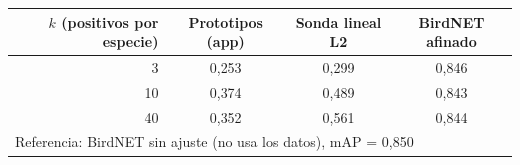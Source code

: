 \begin{tabular}{rccc}
\toprule
$k$ (positivos por especie) & Prototipos (app) & Sonda lineal L2 & BirdNET afinado\\
\midrule
3 & 0{,}253 & 0{,}299 & 0{,}846\\
10 & 0{,}374 & 0{,}489 & 0{,}843\\
40 & 0{,}352 & 0{,}561 & 0{,}844\\
\midrule
\multicolumn{4}{l}{Referencia: BirdNET sin ajuste (no usa los datos), mAP = 0{,}850}\\
\bottomrule
\end{tabular}
